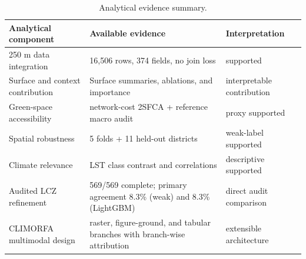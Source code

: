 \begin{table}[!htbp]
\centering
\footnotesize
\caption{Analytical evidence summary.}
\label{tab:evidence_status_legacy}
\begin{tabular}{lll}
\toprule
Analytical component & Available evidence & Interpretation \\
\midrule
250 m data integration & 16,506 rows, 374 fields, no join loss & supported \\
Surface and context contribution & Surface summaries, ablations, and importance & interpretable contribution \\
Green-space accessibility & network-cost 2SFCA + reference macro audit & proxy supported \\
Spatial robustness & 5 folds + 11 held-out districts & weak-label supported \\
Climate relevance & LST class contrast and correlations & descriptive supported \\
Audited LCZ refinement & 569/569 complete; primary agreement 8.3\% (weak) and 8.3\% (LightGBM) & direct audit comparison \\
CLIMORFA multimodal design & raster, figure-ground, and tabular branches with branch-wise attribution & extensible architecture \\
\bottomrule
\end{tabular}
\end{table}
